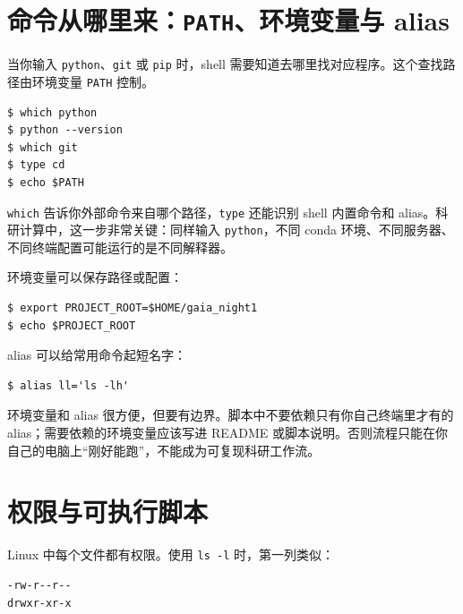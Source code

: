 \section{命令从哪里来：\texttt{PATH}、环境变量与 alias}

当你输入 \texttt{python}、\texttt{git} 或 \texttt{pip} 时，shell 需要知道去哪里找对应程序。这个查找路径由环境变量 \texttt{PATH} 控制。

\begin{examplebox}[检查命令来源]
\begin{lstlisting}[style=terminal]
$ which python
$ python --version
$ which git
$ type cd
$ echo $PATH
\end{lstlisting}
\end{examplebox}

\texttt{which} 告诉你外部命令来自哪个路径，\texttt{type} 还能识别 shell 内置命令和 alias。科研计算中，这一步非常关键：同样输入 \texttt{python}，不同 conda 环境、不同服务器、不同终端配置可能运行的是不同解释器。

环境变量可以保存路径或配置：

\begin{examplebox}[设置项目路径变量]
\begin{lstlisting}[style=terminal]
$ export PROJECT_ROOT=$HOME/gaia_night1
$ echo $PROJECT_ROOT
\end{lstlisting}
\end{examplebox}

alias 可以给常用命令起短名字：

\begin{examplebox}
\begin{lstlisting}[style=terminal]
$ alias ll='ls -lh'
\end{lstlisting}
\end{examplebox}

环境变量和 alias 很方便，但要有边界。脚本中不要依赖只有你自己终端里才有的 alias；需要依赖的环境变量应该写进 README 或脚本说明。否则流程只能在你自己的电脑上“刚好能跑”，不能成为可复现科研工作流。

\section{权限与可执行脚本}

Linux 中每个文件都有权限。使用 \texttt{ls -l} 时，第一列类似：

\begin{lstlisting}[style=terminal]
-rw-r--r--
drwxr-xr-x
\end{lstlisting}

